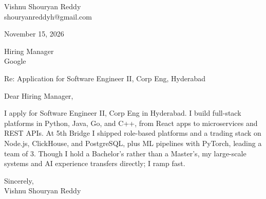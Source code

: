 \documentclass[a4paper,11pt]{article}
\begin{document}
\pagestyle{empty}
Vishnu Shouryan Reddy \\
shouryanreddyh@gmail.com

\vspace{1em}
November 15, 2026

\vspace{1em}
Hiring Manager \\
Google

\vspace{1em}
Re: Application for Software Engineer II, Corp Eng, Hyderabad

\vspace{1em}
Dear Hiring Manager,

\vspace{0.5em}
I apply for Software Engineer II, Corp Eng in Hyderabad. I build full-stack platforms in Python, Java, Go, and C++, from React apps to microservices and REST APIs. At 5th Bridge I shipped role-based platforms and a trading stack on Node.js, ClickHouse, and PostgreSQL, plus ML pipelines with PyTorch, leading a team of 3. Though I hold a Bachelor's rather than a Master's, my large-scale systems and AI experience transfers directly; I ramp fast.

\vspace{1em}
Sincerely, \\
Vishnu Shouryan Reddy
\end{document}
